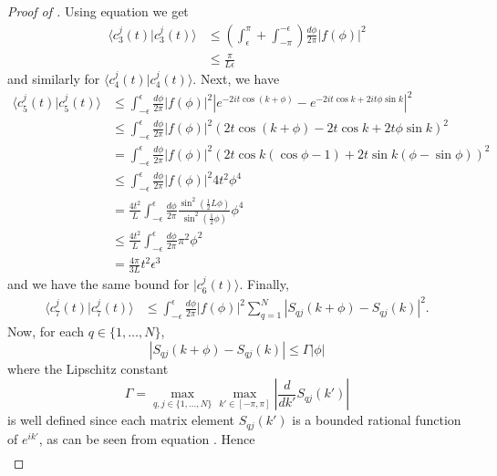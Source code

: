 \documentclass[../thesis-main/thesis-main]{subfiles}
\begin{document}
\begin{proof}[Proof of {}]
Using equation  we get 
\begin{align*}
\langle c_{3}^{j}(t)|c_{3}^{j}(t)\rangle & \leq \left(\int_{\epsilon}^{\pi}+\int_{-\pi}^{-\epsilon}\right)\frac{d\phi}{2\pi}\left|f(\phi)\right|^{2}\\
 & \leq \frac{\pi}{L\epsilon}\end{align*}
and similarly for $\langle c_{4}^{j}(t)|c_{4}^{j}(t)\rangle$.
Next, we have
\begin{align*}
\langle c_{5}^{j}(t)|c_{5}^{j}(t)\rangle & \leq \int_{-\epsilon}^{\epsilon}\frac{d\phi}{2\pi}\left|f(\phi)\right|^{2}\left|e^{-2it\cos\left(k+\phi\right)}-e^{-2it\cos k+2it\phi\sin k}\right|^{2}\\
 & \leq \int_{-\epsilon}^{\epsilon}\frac{d\phi}{2\pi}\left|f(\phi)\right|^{2}\left(2t\cos\left(k+\phi\right)-2t\cos k+2t\phi\sin k\right)^{2}\\
 & = \int_{-\epsilon}^{\epsilon}\frac{d\phi}{2\pi}\left|f(\phi)\right|^{2}\left(2t\cos k\left(\cos\phi-1\right)+2t\sin k\left(\phi-\sin\phi\right)\right)^{2}\\
 & \leq \int_{-\epsilon}^{\epsilon}\frac{d\phi}{2\pi}\left|f(\phi)\right|^{2}4t^{2}\phi^{4}\\
 & = \frac{4t^{2}}{L}\int_{-\epsilon}^{\epsilon}\frac{d\phi}{2\pi}\frac{\sin^{2}(\frac{1}{2}L\phi)}{\sin^{2}(\frac{1}{2}\phi)}\phi^{4}\\
 & \leq \frac{4t^{2}}{L}\int_{-\epsilon}^{\epsilon}\frac{d\phi}{2\pi}\pi^{2}\phi^{2}\\
 & = \frac{4\pi}{3L}t^{2}\epsilon^{3}\end{align*}
 and we have the same bound for $|c_{6}^{j}(t)\rangle$. Finally, 
\begin{align*}
\langle c_{7}^{j}(t)|c_{7}^{j}(t)\rangle & \leq \int_{-\epsilon}^{\epsilon}\frac{d\phi}{2\pi}\left|f(\phi)\right|^{2}\sum_{q=1}^{N}\left|S_{qj}(k+\phi)-S_{qj}(k)\right|^{2}.\end{align*}
Now, for each $q\in\{1,\ldots,N\}$,
\begin{equation}
\left|S_{qj}(k+\phi)-S_{qj}(k)\right| \leq \Gamma |\phi|
\end{equation}
where the Lipschitz constant
\begin{equation}
\Gamma = \max_{q,j\in\{1,\ldots,N\}} \max_{k' \in [-\pi,\pi]}\left|\frac{d}{dk'}S_{qj}(k')\right|
\end{equation}
is well defined since each matrix element $S_{qj}(k')$ is a
bounded rational function of $e^{ik'}$, as can be seen from equation . Hence
\begin{align*}

\end{align*}
\end{proof}
\end{document}
